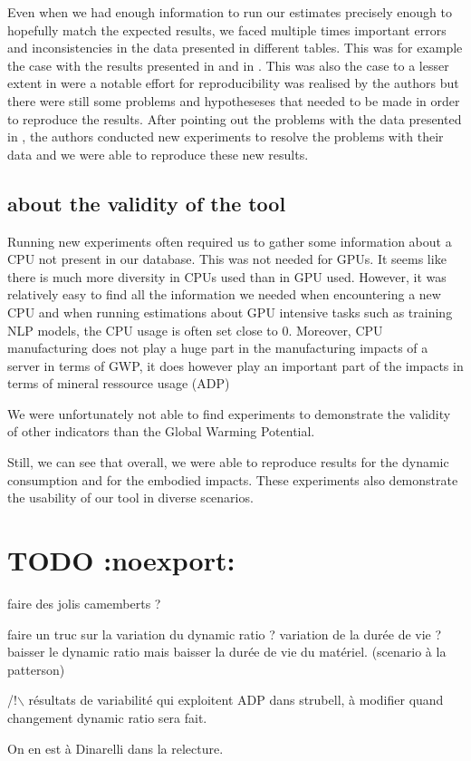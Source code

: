 \documentclass[11pt]{article}
\begin{document}
Even when we had enough information to run our estimates precisely
enough to hopefully match the expected results, we faced multiple
times important errors and inconsistencies in the data presented in
different tables. This was for example the case with the results
presented in \cite{Bannour2021evaluating} and in
\cite{Cattan2022benchmarking}. This was also the case to a lesser
extent in \cite{Jay2023experimental} were a notable effort for
reproducibility was realised by the authors but there were still
some problems and hypotheseses that needed to be made in order to
reproduce the results. 
After pointing out the problems with the data presented in
\cite{Cattan2022benchmarking}, the authors conducted new experiments
to resolve the problems with their data and we were able to reproduce
these new results.

\subsection{about the validity of the tool}
\label{sec:org077fd56}

Running new experiments often required us to gather some information
about a CPU not present in our database. This was not needed for
GPUs. It seems like there is much more diversity in CPUs used than in
GPU used. However, it was relatively easy to find all the information
we needed when encountering a new CPU and when running estimations
about GPU intensive tasks such as training NLP models, the CPU usage
is often set close to 0. Moreover, CPU manufacturing does not play a
huge part in the manufacturing impacts of a server in terms of
\gls{GWP}, it does however play an important part of the impacts in
terms of mineral ressource usage (ADP)

We were unfortunately not able to find experiments to demonstrate the
validity of other indicators than the Global Warming Potential.

Still, we can see that overall, we were able to reproduce results for the
dynamic consumption and for the embodied impacts. These experiments
also demonstrate the usability of our tool in diverse scenarios.


\section{{\bfseries\sffamily TODO} :noexport:}
\label{sec:org3990213}

faire des jolis camemberts ?


faire un truc sur la variation du dynamic ratio ?
variation de la durée de vie ?
baisser le dynamic ratio mais baisser la durée de vie du
matériel. (scenario à la patterson)






/!$\backslash$ résultats de variabilité qui exploitent ADP dans strubell, à
modifier quand changement dynamic ratio sera fait.

On en est à Dinarelli dans la relecture. 
\end{document}

